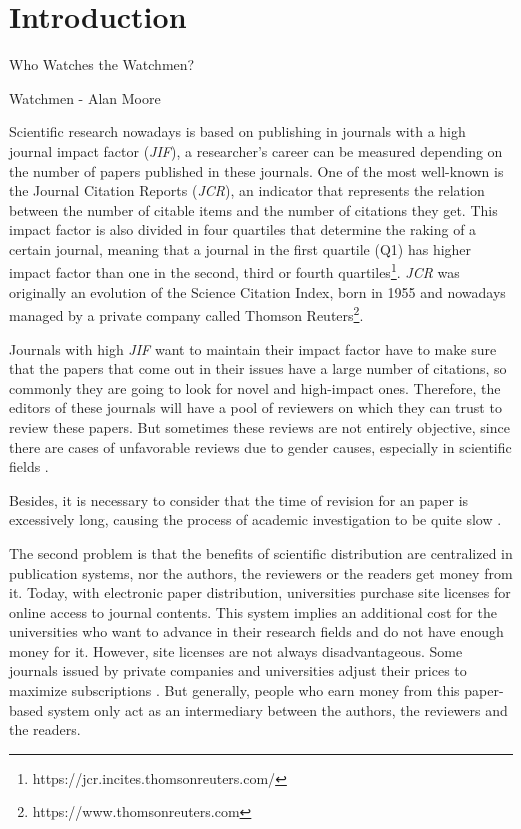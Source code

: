 \chapter{Introduction}
\label{intro}
\begin{FraseCelebre}
  \begin{Frase}
    Who Watches the Watchmen?
  \end{Frase}
  \begin{Fuente}
    Watchmen - Alan Moore
  \end{Fuente}
\end{FraseCelebre}

Scientific research nowadays is based on publishing in journals with a high
journal impact factor (\emph{JIF})\cite{doi:10.1001/jama.295.1.90}, a
researcher's career can be measured depending on the number of papers published
in these journals. One of the most well-known is the Journal Citation Reports
(\emph{JCR}), an indicator that represents the relation between the number of
citable items and the number of citations they get. This impact factor is also
divided in four quartiles that determine the raking of a certain journal,
meaning that a journal in the first quartile (Q1) has higher impact factor than
one in the second, third or fourth
quartiles\footnote{https://jcr.incites.thomsonreuters.com/}. \emph{JCR} was
originally an evolution of the Science Citation Index, born in 1955
\cite{garfield2007evolution} and nowadays managed by a private company called
Thomson Reuters\footnote{https://www.thomsonreuters.com}.

Journals with high \emph{JIF} want to maintain their impact factor have to make
sure that the papers that come out in their issues have a large number of
citations, so commonly they are going to look for novel and high-impact ones.
Therefore, the editors of these journals will have a pool of reviewers on which
they can trust to review these papers. But sometimes these reviews are not
entirely objective, since there are cases of unfavorable reviews due to gender
causes, especially in scientific fields \cite{wenneras2001nepotism}.

Besides, it is necessary to consider that the time of revision for an paper is
excessively long, causing the process of academic investigation to be quite slow
\cite{huisman2017duration}.

The second problem is that the benefits of scientific distribution are
centralized in publication systems, nor the authors, the reviewers or the
readers get money from it. Today, with electronic paper distribution,
universities purchase site licenses for online access to journal contents. This
system implies an additional cost for the universities who want to advance in
their research fields and do not have enough money for it. However, site
licenses are not always disadvantageous. Some journals issued by private
companies and universities adjust their prices to maximize subscriptions
\cite{bergstrom2004costs}. But generally, people who earn money from this
paper-based system only act as an intermediary between the authors, the
reviewers and the readers.

